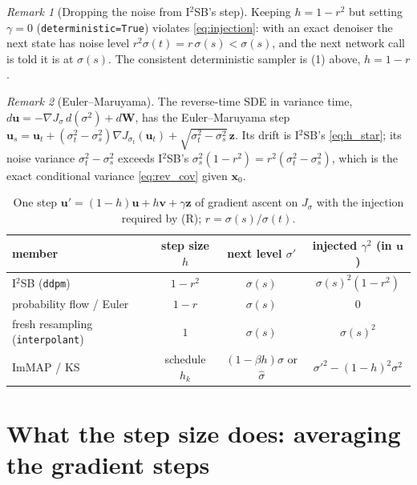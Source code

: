 \documentclass[11pt]{article}
\theoremstyle{definition}
\theoremstyle{remark}
\newtheorem{remark}{Remark}
\newcommand{\x}{\bm{x}}
\newcommand{\uu}{\bm{u}}
\newcommand{\vv}{\bm{v}}
\newcommand{\zz}{\bm{z}}
\newcommand{\grad}{\nabla}
\newcommand{\code}[1]{\texttt{#1}}
\begin{document}
\begin{remark}[Dropping the noise from I$^2$SB's step]
Keeping $h = 1-r^2$ but setting $\gamma=0$ (\code{deterministic=True}) violates
\eqref{eq:injection}: with an exact denoiser the next state has noise level
$r^2\sigma(t) = r\,\sigma(s) < \sigma(s)$, and the next network call is told it is at
$\sigma(s)$. The consistent deterministic sampler is (1) above, $h = 1-r$.
\end{remark}

\begin{remark}[Euler--Maruyama]
The reverse-time SDE in variance time, $d\uu = -\grad J_\sigma\,d(\sigma^2) + d\bm W$, has the
Euler--Maruyama step $\uu_s = \uu_t + (\sigma_t^2-\sigma_s^2)\grad J_{\sigma_t}(\uu_t) +
\sqrt{\sigma_t^2-\sigma_s^2}\,\zz$. Its drift is I$^2$SB's \eqref{eq:h_star}; its noise variance
$\sigma_t^2-\sigma_s^2$ exceeds I$^2$SB's $\sigma_s^2(1-r^2) = r^2(\sigma_t^2 - \sigma_s^2)$,
which is the exact conditional variance \eqref{eq:rev_cov} given $\x_0$.
\end{remark}

\begin{table}[h]
\centering
\small
\begin{tabular}{@{}lccc@{}}
\toprule
member & step size $h$ & next level $\sigma'$ & injected $\gamma^2$ (in $\uu$) \\
\midrule
I$^2$SB (\code{ddpm}) & $1-r^2$ & $\sigma(s)$ & $\sigma(s)^2(1-r^2)$ \\
probability flow / Euler & $1-r$ & $\sigma(s)$ & $0$ \\
fresh resampling (\code{interpolant}) & $1$ & $\sigma(s)$ & $\sigma(s)^2$ \\
ImMAP / KS & schedule $h_k$ & $(1-\beta h)\sigma$ or $\hat\sigma$ & $\sigma'^2 - (1-h)^2\sigma^2$ \\
\bottomrule
\end{tabular}
\caption{One step $\uu' = (1-h)\uu + h\vv + \gamma\zz$ of gradient ascent on
$J_\sigma$ with the injection required by (R); $r = \sigma(s)/\sigma(t)$.}
\label{tab:family}
\end{table}

\section{What the step size does: averaging the gradient steps}
\end{document}
